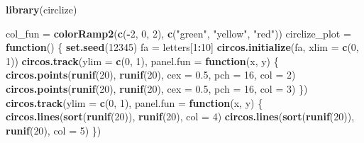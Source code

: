 \documentclass[]{book}
\newenvironment{Shaded}{\begin{snugshade}}{\end{snugshade}}
\newcommand{\KeywordTok}[1]{\textcolor[rgb]{0.13,0.29,0.53}{\textbf{#1}}}
\newcommand{\DataTypeTok}[1]{\textcolor[rgb]{0.13,0.29,0.53}{#1}}
\newcommand{\DecValTok}[1]{\textcolor[rgb]{0.00,0.00,0.81}{#1}}
\newcommand{\FloatTok}[1]{\textcolor[rgb]{0.00,0.00,0.81}{#1}}
\newcommand{\StringTok}[1]{\textcolor[rgb]{0.31,0.60,0.02}{#1}}
\newcommand{\ControlFlowTok}[1]{\textcolor[rgb]{0.13,0.29,0.53}{\textbf{#1}}}
\newcommand{\OperatorTok}[1]{\textcolor[rgb]{0.81,0.36,0.00}{\textbf{#1}}}
\newcommand{\NormalTok}[1]{#1}
\begin{document}
\begin{Shaded}
\begin{Highlighting}[]
\KeywordTok{library}\NormalTok{(circlize)}

\NormalTok{col_fun =}\StringTok{ }\KeywordTok{colorRamp2}\NormalTok{(}\KeywordTok{c}\NormalTok{(}\OperatorTok{-}\DecValTok{2}\NormalTok{, }\DecValTok{0}\NormalTok{, }\DecValTok{2}\NormalTok{), }\KeywordTok{c}\NormalTok{(}\StringTok{"green"}\NormalTok{, }\StringTok{"yellow"}\NormalTok{, }\StringTok{"red"}\NormalTok{))}
\NormalTok{circlize_plot =}\StringTok{ }\ControlFlowTok{function}\NormalTok{() \{}
    \KeywordTok{set.seed}\NormalTok{(}\DecValTok{12345}\NormalTok{)}
\NormalTok{    fa =}\StringTok{ }\NormalTok{letters[}\DecValTok{1}\OperatorTok{:}\DecValTok{10}\NormalTok{]}
    \KeywordTok{circos.initialize}\NormalTok{(fa, }\DataTypeTok{xlim =} \KeywordTok{c}\NormalTok{(}\DecValTok{0}\NormalTok{, }\DecValTok{1}\NormalTok{))}
    \KeywordTok{circos.track}\NormalTok{(}\DataTypeTok{ylim =} \KeywordTok{c}\NormalTok{(}\DecValTok{0}\NormalTok{, }\DecValTok{1}\NormalTok{), }\DataTypeTok{panel.fun =} \ControlFlowTok{function}\NormalTok{(x, y) \{}
        \KeywordTok{circos.points}\NormalTok{(}\KeywordTok{runif}\NormalTok{(}\DecValTok{20}\NormalTok{), }\KeywordTok{runif}\NormalTok{(}\DecValTok{20}\NormalTok{), }\DataTypeTok{cex =} \FloatTok{0.5}\NormalTok{, }\DataTypeTok{pch =} \DecValTok{16}\NormalTok{, }\DataTypeTok{col =} \DecValTok{2}\NormalTok{)}
        \KeywordTok{circos.points}\NormalTok{(}\KeywordTok{runif}\NormalTok{(}\DecValTok{20}\NormalTok{), }\KeywordTok{runif}\NormalTok{(}\DecValTok{20}\NormalTok{), }\DataTypeTok{cex =} \FloatTok{0.5}\NormalTok{, }\DataTypeTok{pch =} \DecValTok{16}\NormalTok{, }\DataTypeTok{col =} \DecValTok{3}\NormalTok{)}
\NormalTok{    \})}
    \KeywordTok{circos.track}\NormalTok{(}\DataTypeTok{ylim =} \KeywordTok{c}\NormalTok{(}\DecValTok{0}\NormalTok{, }\DecValTok{1}\NormalTok{), }\DataTypeTok{panel.fun =} \ControlFlowTok{function}\NormalTok{(x, y) \{}
        \KeywordTok{circos.lines}\NormalTok{(}\KeywordTok{sort}\NormalTok{(}\KeywordTok{runif}\NormalTok{(}\DecValTok{20}\NormalTok{)), }\KeywordTok{runif}\NormalTok{(}\DecValTok{20}\NormalTok{), }\DataTypeTok{col =} \DecValTok{4}\NormalTok{)}
        \KeywordTok{circos.lines}\NormalTok{(}\KeywordTok{sort}\NormalTok{(}\KeywordTok{runif}\NormalTok{(}\DecValTok{20}\NormalTok{)), }\KeywordTok{runif}\NormalTok{(}\DecValTok{20}\NormalTok{), }\DataTypeTok{col =} \DecValTok{5}\NormalTok{)}
\NormalTok{    \})}


\end{Highlighting}
\end{Shaded}
\end{document}
